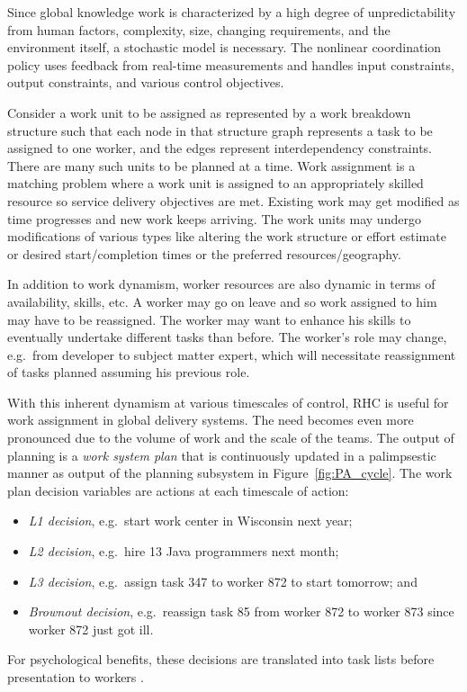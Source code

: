 \documentclass[10pt,journal,cspaper,compsoc]{IEEEtran}
\begin{document}
Since global knowledge work is characterized by a high degree of unpredictability from human factors, complexity, size, 
changing requirements, and the environment itself, a stochastic model is necessary. 
The nonlinear coordination policy uses feedback from real-time measurements and handles input
constraints, output constraints, and various control objectives.

Consider a work unit to be assigned as represented by a work breakdown structure such that each node in that 
structure graph represents a task to be assigned to one worker, and the edges represent interdependency constraints.  
There are many such units to be planned at a time. Work assignment is a matching problem where a work unit is assigned 
to an appropriately skilled resource so service delivery objectives are met. 
Existing work may get modified as time progresses and new work keeps arriving. The work units may undergo modifications 
of various types like altering the work structure or effort estimate or desired start/completion times or the preferred 
resources/geography. 

In addition to work dynamism, worker resources are also dynamic in terms of availability, skills, etc. 
A worker may go on leave and so work assigned to him may have to be reassigned. The worker may want to enhance his skills 
to eventually undertake different tasks than before. The worker's role may change, e.g.\ from developer to subject matter
expert, which will necessitate reassignment of tasks planned assuming his previous role.

With this inherent dynamism at various timescales of control, RHC is useful for work assignment in global delivery systems. 
The need becomes even more pronounced due to the volume of work and the scale of the teams. The output of 
planning is a \emph{work system plan} that is continuously updated in a palimpsestic manner
as output of the planning subsystem in Figure~\ref{fig:PA_cycle}.  The work plan decision variables are actions at each
timescale of action:
\begin{itemize}
  \item \emph{L1 decision}, e.g.\ start work center in Wisconsin next year;
  \item \emph{L2 decision}, e.g.\ hire 13 Java programmers next month;
  \item \emph{L3 decision}, e.g.\ assign task 347 to worker 872 to start tomorrow; and
  \item \emph{Brownout decision}, e.g.\ reassign task 85 from worker 872 to worker 873 since worker 872 just got ill.
\end{itemize}
For psychological benefits, these decisions are translated into task lists before presentation to workers \cite{BellottiDGFBD2004}.
\end{document}
